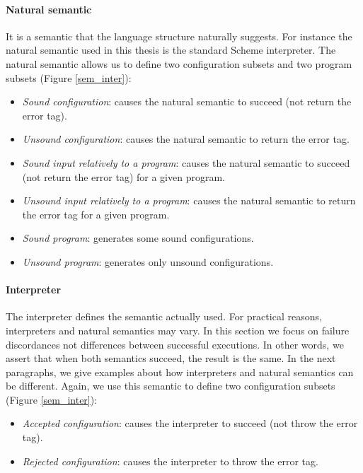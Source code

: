 \documentclass[a4paper]{report}
\newcommand{\reffig}[1]{(Figure \ref{#1})}
\begin{document}
\paragraph{Natural semantic} It is a semantic that the language structure naturally suggests. For instance the natural semantic used in this thesis is the standard Scheme interpreter. The natural semantic allows us to define two configuration subsets and two program subsets \reffig{sem_inter}:
\begin{itemize}
\item \emph{Sound configuration}: causes the natural semantic to succeed (not return the error tag).
\item \emph{Unsound configuration}: causes the natural semantic to return the error tag.
\item \emph{Sound input relatively to a program}: causes the natural semantic to succeed (not return the error tag) for a given program.
\item \emph{Unsound input relatively to a program}: causes the natural semantic to return the error tag for a given program.
\item \emph{Sound program}: generates some sound configurations.
\item \emph{Unsound program}: generates only unsound configurations.
\end{itemize}

\paragraph{Interpreter} The interpreter defines the semantic actually used. For practical reasons, interpreters and natural semantics may vary. In this section we focus on failure discordances not differences between successful executions. In other words, we assert that when both semantics succeed, the result is the same. In the next paragraphs, we give examples about how interpreters and natural semantics can be different. Again, we use this semantic to define two configuration subsets \reffig{sem_inter}:
\begin{itemize}
\item \emph{Accepted configuration}: causes the interpreter to succeed (not throw the error tag).
\item \emph{Rejected configuration}: causes the interpreter to throw the error tag.
\end{itemize}
\end{document}
